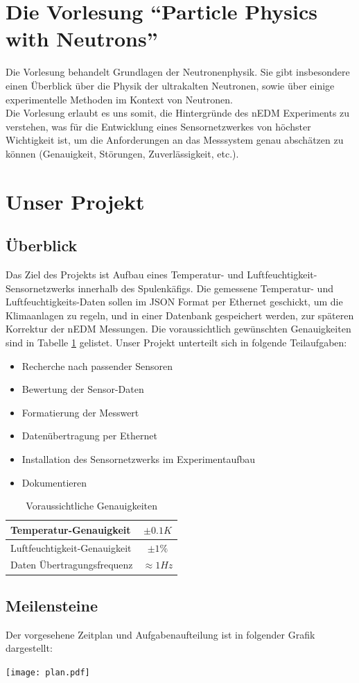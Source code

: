 \documentclass[a4paper]{article} %
\begin{document}
\section*{Die Vorlesung ``Particle Physics with Neutrons''}
Die Vorlesung behandelt Grundlagen der Neutronenphysik. Sie gibt insbesondere
einen Überblick über die Physik der ultrakalten Neutronen, sowie über einige
experimentelle Methoden im Kontext von Neutronen.\\
Die Vorlesung erlaubt es uns somit, die Hintergründe des nEDM Experiments zu
verstehen, was für die Entwicklung eines Sensornetzwerkes von höchster
Wichtigkeit ist, um die Anforderungen an das Messsystem genau abschätzen zu
können (Genauigkeit, Störungen, Zuverlässigkeit, etc.).
\section*{Unser Projekt}
\subsection*{Überblick}
Das Ziel des Projekts ist Aufbau eines Temperatur- und Luftfeuchtigkeit-
Sensornetzwerks innerhalb des Spulenkäfigs. Die gemessene Temperatur- und 
Luft\-feuchtig\-keits-Daten sollen im JSON Format per Ethernet geschickt, um 
die Klimaanlagen zu regeln, und in einer 
Datenbank gespeichert werden, zur späteren Korrektur der nEDM Messungen. 
Die voraus\-sichtlich gewünschten Genauig\-keiten sind in Tabelle \ref{tab:genauigkeit} gelistet.
Unser Projekt unterteilt sich in folgende Teilaufgaben:
\begin{itemize}
\item Recherche nach passender Sensoren 
\item Bewertung der Sensor-Daten
\item Formatierung der Messwert 
\item Datenübertragung per Ethernet
\item Installation des Sensornetzwerks im Experimentaufbau
\item Dokumentieren
\end{itemize}
\begin{table}[h]
  \centering
  \begin{tabular}{|l|c|}
    \hline
    Temperatur-Genauigkeit & $\pm0.1 K$
    \\ \hline
    Luftfeuchtigkeit-Genauigkeit & $\pm 1\%$
    \\ \hline
    Daten Übertragungsfrequenz & $\approx 1Hz$
    \\ \hline
  \end{tabular}
  \caption{Voraussichtliche Genauigkeiten}
  \label{tab:genauigkeit}
\end{table}
\subsection*{Meilensteine}
Der vorgesehene Zeitplan und Aufgabenaufteilung ist in folgender Grafik dargestellt:
\begin{center}
\texttt{[image: plan.pdf]}
\end{center}
\end{document}
